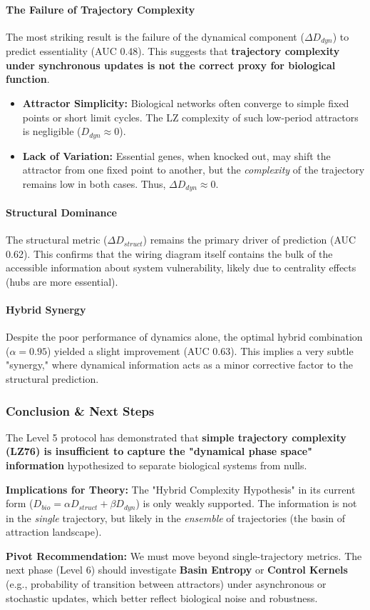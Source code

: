 \paragraph{The Failure of Trajectory Complexity}
The most striking result is the failure of the dynamical component ($\Delta D_{dyn}$) to predict essentiality (AUC 0.48). This suggests that \textbf{trajectory complexity under synchronous updates is not the correct proxy for biological function}.
\begin{itemize}
    \item \textbf{Attractor Simplicity:} Biological networks often converge to simple fixed points or short limit cycles. The LZ complexity of such low-period attractors is negligible ($D_{dyn} \approx 0$).
    \item \textbf{Lack of Variation:} Essential genes, when knocked out, may shift the attractor from one fixed point to another, but the \textit{complexity} of the trajectory remains low in both cases. Thus, $\Delta D_{dyn} \approx 0$.
\end{itemize}

\paragraph{Structural Dominance}
The structural metric ($\Delta D_{struct}$) remains the primary driver of prediction (AUC 0.62). This confirms that the wiring diagram itself contains the bulk of the accessible information about system vulnerability, likely due to centrality effects (hubs are more essential).

\paragraph{Hybrid Synergy}
Despite the poor performance of dynamics alone, the optimal hybrid combination ($\alpha=0.95$) yielded a slight improvement (AUC 0.63). This implies a very subtle "synergy," where dynamical information acts as a minor corrective factor to the structural prediction.

\subsubsection{Conclusion \& Next Steps}
The Level 5 protocol has demonstrated that \textbf{simple trajectory complexity (LZ76) is insufficient to capture the "dynamical phase space" information} hypothesized to separate biological systems from nulls.

\textbf{Implications for Theory:}
The "Hybrid Complexity Hypothesis" in its current form ($D_{bio} = \alpha D_{struct} + \beta D_{dyn}$) is only weakly supported. The information is not in the \textit{single} trajectory, but likely in the \textit{ensemble} of trajectories (the basin of attraction landscape).

\textbf{Pivot Recommendation:}
We must move beyond single-trajectory metrics. The next phase (Level 6) should investigate \textbf{Basin Entropy} or \textbf{Control Kernels} (e.g., probability of transition between attractors) under asynchronous or stochastic updates, which better reflect biological noise and robustness.
